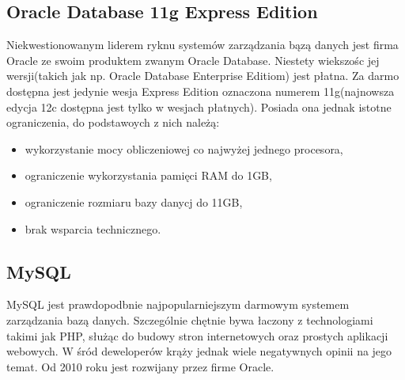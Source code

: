 \subsection[Oracle Database 11g Express Edition][Oracle Database 11g Express Edition]{Oracle Database 11g Express Edition} 
Niekwestionowanym liderem ryknu systemów zarządzania bązą danych jest firma Oracle ze swoim produktem zwanym Oracle Database. Niestety wiekszośc jej wersji(takich jak np. Oracle Database Enterprise Editiom) jest płatna. Za darmo dostępna jest jedynie wesja Express Edition oznaczona numerem 11g(najnowsza edycja 12c dostępna jest tylko w wesjach płatnych).  Posiada ona jednak istotne ograniczenia, do podstawoych z nich należą:
\begin{itemize}
	\item wykorzystanie mocy obliczeniowej co najwyżej jednego procesora,
	\item ograniczenie wykorzystania pamięci RAM do 1GB,
	\item ograniczenie rozmiaru bazy danycj do 11GB,
	\item brak wsparcia technicznego.
\end{itemize}

\subsection[MySQL][MySQL]{MySQL} 
MySQL jest prawdopodbnie najpopularniejszym darmowym systemem zarządzania bazą danych. Szczególnie chętnie bywa łaczony z technologiami takimi jak PHP, służąc do budowy stron internetowych oraz prostych aplikacji webowych. W śród deweloperów krąży jednak wiele negatywnych opinii na jego temat. Od 2010 roku jest rozwijany przez firme Oracle.

